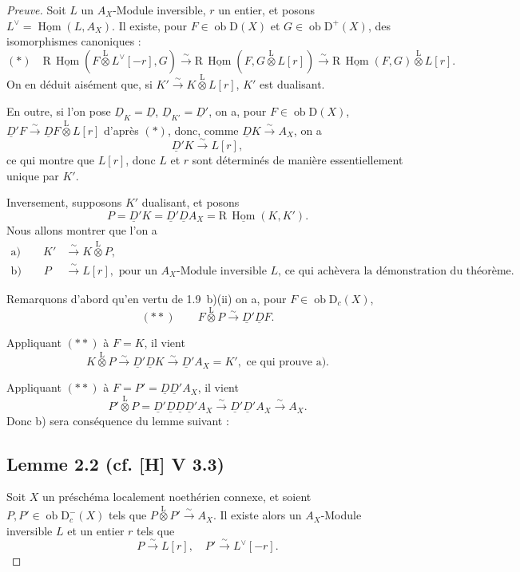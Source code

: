 \documentclass[11pt]{article}
\DeclareMathOperator{\Hom}{Hom}
\newcommand{\R}{\mathrm{R}}\newcommand{\RHomCore}{\mathrm{RHom}}
\newcommand{\D}{\mathrm{D}}
\newcommand{\ob}{\operatorname{ob}}
\providecommand{\Hom}{\operatorname{Hom}}
\providecommand{\ob}{\operatorname{ob}}
\providecommand{\R}{\mathrm R}
\providecommand{\Hom}{\operatorname{Hom}}
\begin{document}
\begin{proof}[Preuve]
Soit $L$ un $A_X$-Module inversible, $r$ un entier, et posons $L^{\vee} = \underline{\Hom}(L, A_X)$. Il existe, pour $F \in \ob \D(X)$ et $G \in \ob \D^{+}(X)$, des isomorphismes canoniques :
\[
(*) \quad \R\,\underline{\Hom}(F \mathop{\otimes}\limits^{\mathrm{L}} L^{\vee}[-r], G) \xrightarrow{\sim} \R\,\underline{\Hom}(F, G \mathop{\otimes}\limits^{\mathrm{L}} L[r]) \xrightarrow{\sim} \R\,\underline{\Hom}(F,G) \mathop{\otimes}\limits^{\mathrm{L}} L[r].
\]
On en déduit aisément que, si $K' \xrightarrow{\sim} K \mathop{\otimes}\limits^{\mathrm{L}} L[r]$, $K'$ est dualisant.

En outre, si l'on pose $\underline{D}_K = \underline{D}$, $\underline{D}_{K'} = \underline{D}'$, on a, pour $F \in \ob \D(X)$, $\underline{D}'F \xrightarrow{\sim} \underline{D} F \mathop{\otimes}\limits^{\mathrm{L}} L[r]$ d'après $(*)$, donc, comme $\underline{D} K \xrightarrow{\sim} A_X$, on a
\[
\underline{D}' K \xrightarrow{\sim} L[r],
\]
ce qui montre que $L[r]$, donc $L$ et $r$ sont déterminés de manière essentiellement unique par $K'$.

Inversement, supposons $K'$ dualisant, et posons
\[
P = \underline{D}'K = \underline{D}'\underline{D} A_X = \R\,\underline{\Hom}(K,K').
\]
Nous allons montrer que l'on a
\begin{align*}
\text{a)} \qquad K' &\xrightarrow{\sim} K \mathop{\otimes}\limits^{\mathrm{L}} P, \\
\text{b)} \qquad P &\xrightarrow{\sim} L[r], \text{ pour un $A_X$-Module inversible $L$, ce qui achèvera la démonstration du théorème.}
\end{align*}

Remarquons d'abord qu'en vertu de 1.9~b)(ii) on a, pour $F \in \ob \D_c(X)$,
\[
(**) \qquad F \mathop{\otimes}\limits^{\mathrm{L}} P \xrightarrow{\sim} \underline{D}'\underline{D} F.
\]

Appliquant $(**)$ à $F = K$, il vient
\[
K \mathop{\otimes}\limits^{\mathrm{L}} P \xrightarrow{\sim} \underline{D}'\underline{D} K \xrightarrow{\sim} \underline{D}' A_X = K', \text{ ce qui prouve a).}
\]

Appliquant $(**)$ à $F = P' = \underline{D}\underline{D}'A_X$, il vient
\[
P' \mathop{\otimes}\limits^{\mathrm{L}} P = \underline{D}'\underline{D}\underline{D}\underline{D}'A_X \xrightarrow{\sim} \underline{D}'\underline{D}'A_X \xrightarrow{\sim} A_X.
\]
Donc b) sera conséquence du lemme suivant :

\subsection*{Lemme 2.2 (cf. [H] V 3.3)}
Soit $X$ un préschéma localement noethérien connexe, et soient $P, P' \in \ob \D_c^{-}(X)$ tels que $P \mathop{\otimes}\limits^{\mathrm{L}} P' \xrightarrow{\sim} A_X$. Il existe alors un $A_X$-Module inversible $L$ et un entier $r$ tels que
\[
P \xrightarrow{\sim} L[r], \quad P' \xrightarrow{\sim} L^{\vee}[-r].
\]


\end{proof}
\end{document}
